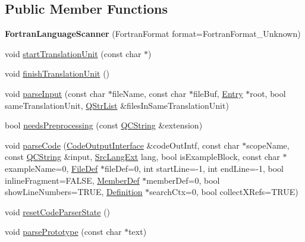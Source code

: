 \subsection*{Public Member Functions}
\begin{DoxyCompactItemize}
\item 
\mbox{\label{class_fortran_language_scanner_aca495d95c594b1fe4ed120aa03a30f3e}} 
{\bfseries Fortran\+Language\+Scanner} (Fortran\+Format format=Fortran\+Format\+\_\+\+Unknown)
\item 
void \mbox{\hyperlink{class_fortran_language_scanner_a571f9440b581ce6fdc1b15c08427932d}{start\+Translation\+Unit}} (const char $\ast$)
\item 
void \mbox{\hyperlink{class_fortran_language_scanner_abf5a872f1e3bd81f5a285e9586869def}{finish\+Translation\+Unit}} ()
\item 
void \mbox{\hyperlink{class_fortran_language_scanner_a6f2e7fa4a4d46ae48289cd135f9f495d}{parse\+Input}} (const char $\ast$file\+Name, const char $\ast$file\+Buf, \mbox{\hyperlink{class_entry}{Entry}} $\ast$root, bool same\+Translation\+Unit, \mbox{\hyperlink{class_q_str_list}{Q\+Str\+List}} \&files\+In\+Same\+Translation\+Unit)
\item 
bool \mbox{\hyperlink{class_fortran_language_scanner_a94620ec6b6cf583dccd2544671e9e578}{needs\+Preprocessing}} (const \mbox{\hyperlink{class_q_c_string}{Q\+C\+String}} \&extension)
\item 
void \mbox{\hyperlink{class_fortran_language_scanner_a76c29cd4656300093fba9179184a4a7c}{parse\+Code}} (\mbox{\hyperlink{class_code_output_interface}{Code\+Output\+Interface}} \&code\+Out\+Intf, const char $\ast$scope\+Name, const \mbox{\hyperlink{class_q_c_string}{Q\+C\+String}} \&input, \mbox{\hyperlink{types_8h_a9974623ce72fc23df5d64426b9178bf2}{Src\+Lang\+Ext}} lang, bool is\+Example\+Block, const char $\ast$example\+Name=0, \mbox{\hyperlink{class_file_def}{File\+Def}} $\ast$file\+Def=0, int start\+Line=-\/1, int end\+Line=-\/1, bool inline\+Fragment=F\+A\+L\+SE, \mbox{\hyperlink{class_member_def}{Member\+Def}} $\ast$member\+Def=0, bool show\+Line\+Numbers=T\+R\+UE, \mbox{\hyperlink{class_definition}{Definition}} $\ast$search\+Ctx=0, bool collect\+X\+Refs=T\+R\+UE)
\item 
void \mbox{\hyperlink{class_fortran_language_scanner_a431c7d79af2cd6b93081f3db7cdaf1c0}{reset\+Code\+Parser\+State}} ()
\item 
void \mbox{\hyperlink{class_fortran_language_scanner_a8ae8487e02f24ee625ad804b9bda78b3}{parse\+Prototype}} (const char $\ast$text)
\end{DoxyCompactItemize}



